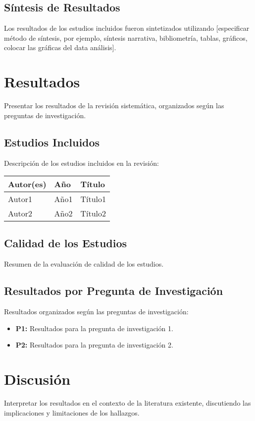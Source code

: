 \documentclass{article}
\begin{document}
\subsection{Síntesis de Resultados}
\noindent Los resultados de los estudios incluidos fueron sintetizados utilizando [especificar método de síntesis, por ejemplo, síntesis narrativa, bibliometría, tablas, gráficos, colocar las gráficas del data análisis].




\section{Resultados}
\noindent Presentar los resultados de la revisión sistemática, organizados según las preguntas de investigación.

\subsection{Estudios Incluidos}
\noindent Descripción de los estudios incluidos en la revisión:
\begin{longtable}{|p{3cm}|p{3cm}|p{8cm}|}
    \hline
    \textbf{Autor(es)} & \textbf{Año} & \textbf{Título} \\
    \hline
    Autor1 & Año1 & Título1 \\
    Autor2 & Año2 & Título2 \\
    \hline
\end{longtable}

\subsection{Calidad de los Estudios}
\noindent Resumen de la evaluación de calidad de los estudios.

\subsection{Resultados por Pregunta de Investigación}
\noindent Resultados organizados según las preguntas de investigación:
\begin{itemize}
    \item \textbf{P1:} Resultados para la pregunta de investigación 1.
    \item \textbf{P2:} Resultados para la pregunta de investigación 2.
\end{itemize}

\section{Discusión}
\noindent Interpretar los resultados en el contexto de la literatura existente, discutiendo las implicaciones y limitaciones de los hallazgos.
\end{document}
